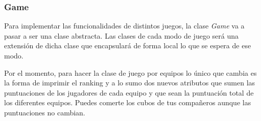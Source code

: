 \documentclass{article}
\begin{document}
\subsubsection*{Game}
Para implementar las funcionalidades de distintos juegos, la clase \textit{Game} va a pasar a ser una clase abstracta. Las clases de cada modo de juego será una extensión de dicha clase que encapsulará de forma local lo que se espera de ese modo.

Por el momento, para hacer la clase de juego por equipos lo único que cambia es la forma de imprimir el ranking y a lo sumo dos nuevos atributos que sumen las puntuaciones de los jugadores de cada equipo y que sean la puntuación total de los diferentes equipos. Puedes comerte los cubos de tus compañeros aunque las puntuaciones no cambian.
\end{document}
